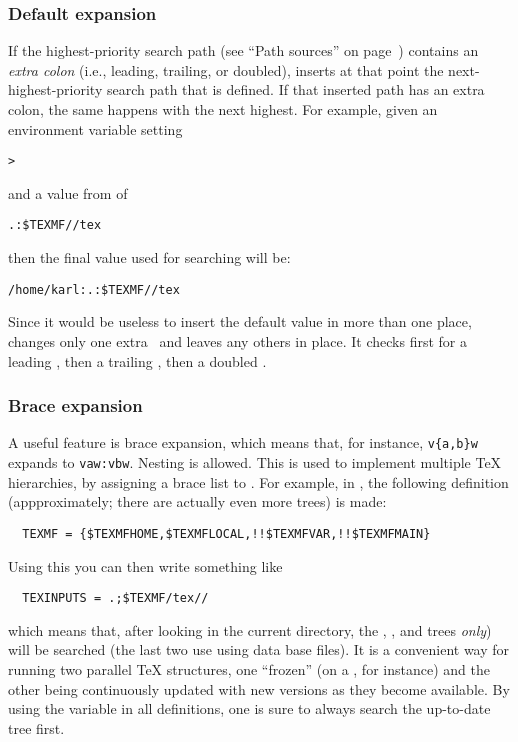 \documentclass{article}
\begin{document}
\subsubsection{Default expansion}
\label{Default-expansion}

If the highest-priority search path (see ``Path sources'' on
page~\pageref{Path-sources}) contains an \emph{extra colon} (i.e.,
leading, trailing, or doubled), \KPS{} inserts at that point the
next-highest-prio\-rity search path that is defined.  If that inserted
path has an extra colon, the same happens with the next highest.  For
example, given an environment variable setting


\begin{alltt}
> 
\end{alltt}
and a  value from  of

\begin{alltt}
  .:\$TEXMF//tex
\end{alltt}
then the final value used for searching will be:

\begin{alltt}
  /home/karl:.:\$TEXMF//tex
\end{alltt}

Since it would be useless to insert the default value in more than one
place, \KPS{} changes only one extra \samp{:}\ and leaves any others in
place.  It checks first for a leading \samp{:}, then a trailing
\samp{:}, then a doubled \samp{:}.

\subsubsection{Brace expansion}

A useful feature is brace expansion, which means that, for instance,
\verb+v{a,b}w+ expands to \verb+vaw:vbw+. Nesting is allowed.
This is used to implement multiple \TeX{} hierarchies, by
assigning a brace list to .
For example, in , the following definition
(appproximately; there are actually even more trees) is made:
\begin{verbatim}
  TEXMF = {$TEXMFHOME,$TEXMFLOCAL,!!$TEXMFVAR,!!$TEXMFMAIN}
\end{verbatim}
Using this you can then write something like
\begin{verbatim}
  TEXINPUTS = .;$TEXMF/tex//
\end{verbatim}
which means that, after looking in the current directory, the
, , 
and  trees \emph{only}) will be searched (the
last two use using  data base files). It is a convenient
way for running two parallel \TeX{} structures, one ``frozen'' (on a
\CD, for instance) and the other being continuously updated with new
versions as they become available.  By using the 
variable in all definitions, one is sure to always search the
up-to-date tree first.
\end{document}
